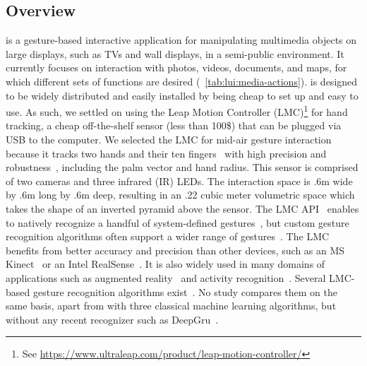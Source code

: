\subsection{Overview} \label{sec:lui:description:overview}
\lui is a gesture-based interactive application for manipulating multimedia objects on large displays, such as TVs and wall displays, in a semi-public environment.
It currently focuses on interaction with photos, videos, documents, and maps, for which different sets of functions are desired (\tab~\ref{tab:lui:media-actions}). \lui is designed to be widely distributed and easily installed by being cheap to set up and easy to use. As such, we settled on using the Leap Motion Controller (LMC)\footnote{See \url{https://www.ultraleap.com/product/leap-motion-controller/}} for hand tracking, a cheap off-the-shelf sensor (less than 100\$) that can be plugged via USB to the computer. We selected the LMC for mid-air gesture interaction because it tracks two hands and their ten fingers~\cite{Colgan:2017} with high precision and robustness~\cite{Weichert:2013}, including the palm vector and hand radius. This sensor is comprised of two cameras and three infrared (IR) LEDs. The interaction space is .6m wide by .6m long by .6m deep, resulting in an .22 cubic meter volumetric space which takes the shape of an inverted pyramid above the sensor.
The LMC API~\cite{Spiegelmock:2013} enables to natively recognize a handful of system-defined gestures~\cite{Brandon:2014}, but custom gesture recognition algorithms often support a wider range of gestures~\cite{Bachmann:2018}. The LMC benefits from better accuracy and precision than other devices, such as an MS Kinect~\cite{Guzsvinecz:2019} or an Intel RealSense~\cite{Khalaf:2019}.
It is also widely used in many domains of applications such as augmented reality~\cite{Lopez:2015} and activity recognition~\cite{Marin:2016}. Several LMC-based gesture recognition algorithms exist~\cite{Bachmann:2018}. No study compares them on the same basis, apart from \cite{Filho:2018} with three classical machine learning algorithms, but without any recent recognizer such as  DeepGru~\cite{Maghoumi:2019}.

